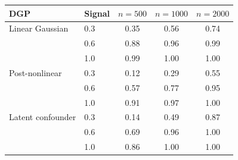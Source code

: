 \begin{tabular}{llccc}
    \toprule
    DGP & Signal & $n{=}500$ & $n{=}1000$ & $n{=}2000$ \\
    \midrule
    Linear Gaussian    & 0.3 & 0.35   & 0.56   & 0.74   \\
                       & 0.6 & 0.88   & 0.96   & 0.99   \\
                       & 1.0 & 0.99   & 1.00   & 1.00   \\
    \midrule
    Post-nonlinear     & 0.3 & 0.12   & 0.29   & 0.55   \\
                       & 0.6 & 0.57   & 0.77   & 0.95   \\
                       & 1.0 & 0.91   & 0.97   & 1.00   \\
    \midrule
    Latent confounder  & 0.3 & 0.14   & 0.49   & 0.87   \\
                       & 0.6 & 0.69   & 0.96   & 1.00   \\
                       & 1.0 & 0.86   & 1.00   & 1.00   \\
    \bottomrule
\end{tabular}
